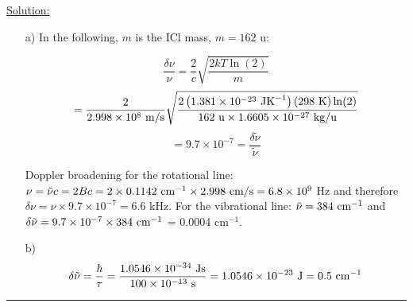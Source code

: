 \noindent
\underline{Solution:}\\

\noindent

\begin{itemize}

\item[a)] In the following, $m$ is the ICl mass, $m = 162$ u:

$$\frac{\delta\nu}{\nu} = \frac{2}{c}\sqrt{\frac{2kT\ln(2)}{m}}$$
$$ = \frac{2}{2.998\times 10^8\textnormal{ m/s}}\sqrt{\frac{2\left(1.381\times 10^{-23}\textnormal{ JK}^{-1}\right)\left(298\textnormal{ K}\right)\ln(2)}{162\textnormal{ u}\times 1.6605\times 10^{-27}\textnormal{ kg/u}}}$$
$$ = 9.7\times 10^{-7} = \frac{\delta\tilde{\nu}}{\tilde{\nu}}$$

Doppler broadening for the rotational line: $\nu = \tilde{\nu}c = 2Bc = 2\times 0.1142\textnormal{ cm}^{-1} \times 2.998\textnormal{ cm/s} = 6.8\times 10^9$ Hz and therefore $\delta\nu = \nu\times 9.7\times 10^{-7} = 6.6$ kHz. For the vibrational line: $\tilde{\nu} = 384\textnormal{ cm}^{-1}$ and $\delta\tilde{\nu} = 9.7\times 10^{-7}\times 384\textnormal{ cm}^{-1}$ = 0.0004 cm$^{-1}$.

\item[b)] $$\delta\tilde{\nu} = \frac{\hbar}{\tau} = \frac{1.0546\times 10^{-34}\textnormal{ Js}}{100\times 10^{-13}\textnormal{ s}} = 1.0546\times 10^{-23}\textnormal{ J} = 0.5\textnormal{ cm}^{-1}$$
\end{itemize}

\hrule\vspace{0.5cm}



